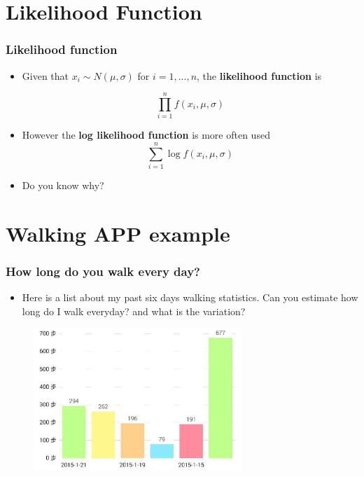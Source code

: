 \documentclass[10pt]{beamer}
\begin{document}
\section{Likelihood Function}
\begin{frame}
  \frametitle{Likelihood function}

  \begin{itemize}
  \item Given that $x_i\sim N(\mu,\sigma)$ for $i=1,...,n$, the
    \textbf{likelihood function} is

    \begin{equation*}
      \prod_{i=1}^n f(x_i,\mu,\sigma)
    \end{equation*}

  \item However the \textbf{log likelihood function} is more often used
    \begin{equation*}
      \sum_{i=1}^n \log f(x_i,\mu,\sigma)
    \end{equation*}

  \item Do you know why?

  \end{itemize}
\end{frame}


\section{Walking APP example}

\begin{frame}
  \frametitle{How long do you walk every day?}

  \begin{itemize}
  \item Here is a list about my past six days walking statistics. Can you estimate how
    long do I walk everyday? and what is the variation?

  \end{itemize}

    \begin{figure}
      \includegraphics[width=0.7\textwidth]{walking2}
    \end{figure}

\end{frame}
\end{document}
